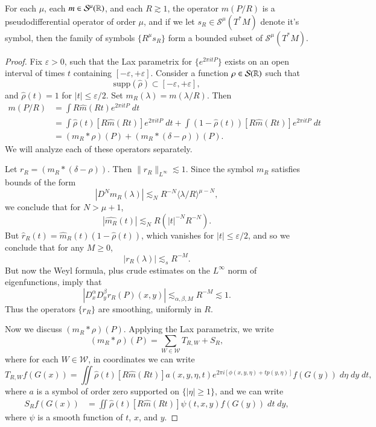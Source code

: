 \begin{lemma}
    For each $\mu$, each $m \in \mathcal{S}^\mu(\operatorname{\mathbb{R}})$, and each $R \gtrsim 1$, the operator $m(P/R)$ is a pseudodifferential operator of order $\mu$, and if we let $s_R \in \mathcal{S}^\mu(T^* M)$ denote it's symbol, then the family of symbols $\{ R^\mu s_R \}$ form a bounded subset of $\mathcal{S}^\mu(T^* M)$.
\end{lemma}
\begin{proof}
    Fix $\varepsilon > 0$, such that the Lax parametrix for $\{ e^{2 \pi i t P} \}$ exists on an open interval of times $t$ containing $[-\varepsilon,+\varepsilon]$. Consider a function $\rho \in \mathcal{S}(\operatorname{\mathbb{R}})$ such that
    \[ \text{supp} \left( \widehat{\rho} \right) \subset [-\varepsilon, +\varepsilon], \]
    and $\widehat{\rho}(t) = 1$ for $|t| \leq \varepsilon/2$. Set $m_R(\lambda) = m(\lambda / R)$. Then
    \begin{align*}
        m(P/R) &= \int R \widehat{m}(Rt) e^{2 \pi i t P}\; dt\\
        &= \int \widehat{\rho}(t) [R \widehat{m}(Rt)] e^{2 \pi i t P}\; dt + \int (1 - \widehat{\rho}(t)) [R \widehat{m}(Rt)] e^{2 \pi i t P}\; dt\\
        &= (m_R * \rho)(P) + (m_R * (\delta - \rho))(P).
    \end{align*}
    We will analyze each of these operators separately.

    Let $r_R = (m_R * (\delta - \rho))$. Then $\| r_R \|_{L^\infty} \lesssim 1$. Since the symbol $m_R$ satisfies bounds of the form
    \[ |D^N m_R(\lambda)| \lesssim_N R^{-N} \langle \lambda / R \rangle^{\mu - N}, \]
    we conclude that for $N > \mu + 1$,
    \[ |\widehat{m_R}(t)| \lesssim_N R \left( |t|^{-N} R^{-N} \right). \]
    But $\widehat{r}_R(t) = \widehat{m}_R(t) (1 - \widehat{\rho}(t))$, which vanishes for $|t| \leq \varepsilon/2$, and so we conclude that for any $M \geq 0$,
    \[ |r_R(\lambda)| \lesssim_s R^{-M}. \]
    But now the Weyl formula, plus crude estimates on the $L^\infty$ norm of eigenfunctions, imply that
    \[ |D^\alpha_x D^\beta_y r_R(P)(x,y)| \lesssim_{\alpha,\beta,M} R^{-M} \lesssim 1. \]
    Thus the operators $\{ r_R \}$ are smoothing, uniformly in $R$.

    Now we discuss $(m_R * \rho)(P)$. Applying the Lax parametrix, we write
    \[ (m_R * \rho)(P) = \sum_{W \in \mathcal{W}} T_{R,W} + S_R, \]
    where for each $W \in \mathcal{W}$, in coordinates we can write
    \[ T_{R,W} f(G(x)) = \iint \widehat{\rho}(t) [R \widehat{m}(Rt)] a(x,y,\eta,t) e^{2 \pi i [ \phi(x,y,\eta) + t p(y,\eta) ]} f(G(y))\; d\eta\; dy\; dt, \]
    where $a$ is a symbol of order zero supported on $\{ |\eta| \geq 1 \}$, and we can write
    \begin{align*}
        S_R f(G(x)) &= \iint \widehat{\rho}(t) [R \widehat{m}(Rt)] \psi(t,x,y) f(G(y))\; dt\; dy,
    \end{align*}
    where $\psi$ is a smooth function of $t$, $x$, and $y$.


\end{proof}

